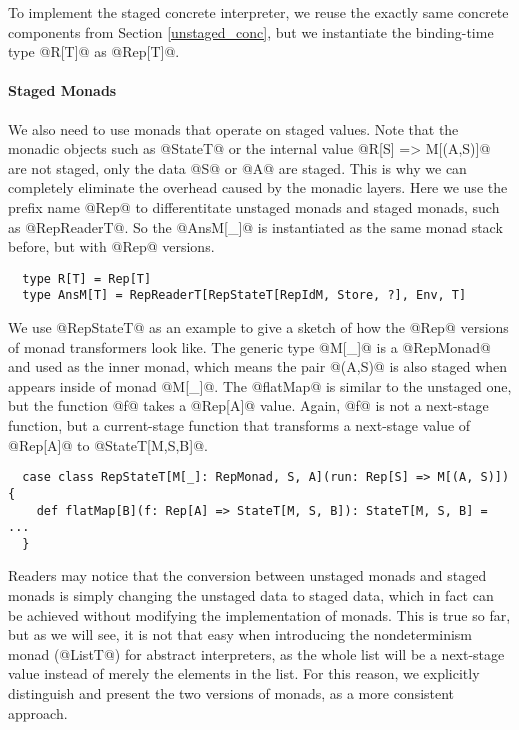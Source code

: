 To implement the staged concrete interpreter, we reuse the exactly same concrete
components from Section \ref{unstaged_conc}, but we instantiate the binding-time
type @R[T]@ as @Rep[T]@.

\paragraph{Staged Monads} We also need to use monads that operate on staged
values. Note that the monadic objects such as @StateT@ or the internal value
@R[S] => M[(A,S)]@ are not staged, only the data @S@ or @A@ are staged.
This is why we can completely eliminate the overhead caused by the monadic layers.
Here we use the prefix name @Rep@ to differentitate unstaged monads and staged
monads, such as @RepReaderT@. So the @AnsM[_]@ is instantiated as the same monad
stack before, but with @Rep@ versions.

\begin{lstlisting}
  type R[T] = Rep[T]
  type AnsM[T] = RepReaderT[RepStateT[RepIdM, Store, ?], Env, T]
\end{lstlisting}

We use @RepStateT@ as an example to give a sketch of how the @Rep@ versions of monad
transformers look like. The generic type @M[_]@ is a @RepMonad@ and used as the
inner monad, which means the pair @(A,S)@ is also staged when appears inside of monad
@M[_]@. The @flatMap@ is similar to the unstaged one, but the function @f@ takes
a @Rep[A]@ value. Again, @f@ is not a next-stage function, but a current-stage
function that transforms a next-stage value of @Rep[A]@ to @StateT[M,S,B]@.

\begin{lstlisting}
  case class RepStateT[M[_]: RepMonad, S, A](run: Rep[S] => M[(A, S)]) {
    def flatMap[B](f: Rep[A] => StateT[M, S, B]): StateT[M, S, B] = ...
  }
\end{lstlisting}

Readers may notice that the conversion between unstaged monads and staged monads
is simply changing the unstaged data to staged data, which in fact can be
achieved without modifying the implementation of monads. This is true so far, but
as we will see, it is not that easy when introducing the nondeterminism monad
(@ListT@) for abstract interpreters, as the whole list will be a next-stage
value instead of merely the elements in the list. For this reason, we explicitly
distinguish and present the two versions of monads, as a more consistent
approach.


